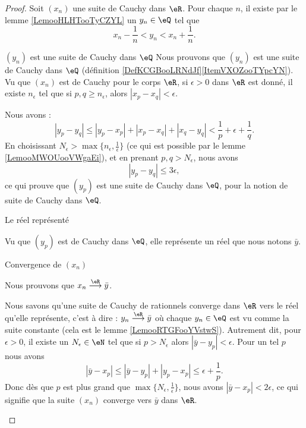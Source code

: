 \begin{proof}
    Soit \( (x_n)\) une suite de Cauchy dans \( \eR\). Pour chaque \( n\), il existe par le lemme \ref{LemooHLHTooTyCZYL} un \( y_n\in \eQ\) tel que 
    \begin{equation}
        x_n-\frac{1}{ n }<y_n<x_n+\frac{1}{ n }.
    \end{equation}
    \begin{subproof}
        \item[\( (y_n)\) est une suite de Cauchy dans \( \eQ\)]
            Nous prouvons que \( (y_n)\) est une suite de Cauchy dans \( \eQ\) (définition \ref{DefKCGBooLRNdJf}\ref{ItemVXOZooTYpcYN}). Vu que \( (x_n)\) est de Cauchy pour le corps \( \eR\), si \( \epsilon>0\) dans \( \eR\) est donné, il existe \( n_{\epsilon}\) tel que si \( p,q\geq n_{\epsilon}\), alors \( | x_p-x_q |<\epsilon\).

        Nous avons :
        \begin{equation}
            | y_p-y_q |\leq | y_p-x_p |+| x_p-x_q |+| x_q-y_q |<\frac{1}{ p }+\epsilon+\frac{1}{ q }.
        \end{equation}
        En choisissant \( N_{\epsilon}>\max\{ n_{\epsilon},\frac{1}{ \epsilon } \}\) (ce qui est possible par le lemme \ref{LemooMWOUooVWgaEi}), et en prenant \( p,q>N_{\epsilon}\), nous avons
        \begin{equation}
            | y_p-y_q |\leq 3\epsilon,
        \end{equation}
        ce qui prouve que \( (y_p)\) est une suite de Cauchy dans \( \eQ\), pour la notion de suite de Cauchy dans \( \eQ\). 
        
    \item[Le réel représenté]
        
        Vu que \( (y_p)\) est de Cauchy dans \( \eQ\), elle représente un réel que nous notons \( \bar y\).

    \item[Convergence de \( (x_n)\)]

        Nous prouvons que \(     x_n\stackrel{\eR}{\longrightarrow}\bar y \).

        Nous savons qu'une suite de Cauchy de rationnels converge dans \( \eR\) vers le réel qu'elle représente, c'est à dire : \( y_n\stackrel{\eR}{\longrightarrow}\bar y\) où chaque \( y_n\in \eQ\) est vu comme la suite constante (cela est le lemme \ref{LemooRTGFooYVstwS}). Autrement dit, pour \( \epsilon>0\), il existe un \( N_{\epsilon}\in \eN\) tel que si \( p>N_{\epsilon}\) alors \( | \bar y-y_p |<\epsilon\). Pour un tel \( p\) nous avons
        \begin{equation}
            | \bar y-x_p |\leq| \bar y-y_p |+| y_p-x_p |\leq \epsilon+\frac{1}{ p }.
        \end{equation}
        Donc dès que \( p\) est plus grand que \( \max\{ N_{\epsilon},\frac{1}{ \epsilon } \}\), nous avons \( | \bar y-x_p |<2\epsilon\), ce qui signifie que la suite \( (x_n) \) converge vers \( \bar y\) dans \( \eR\).


\end{subproof}
\end{proof}
